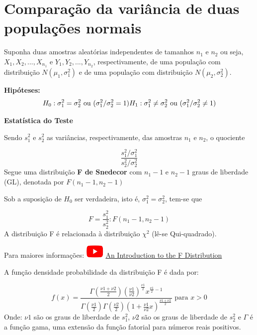 \documentclass[
]{book}
\begin{document}
\hypertarget{comparauxe7uxe3o-da-variuxe2ncia-de-duas-populauxe7uxf5es-normais}{%
\section{Comparação da variância de duas populações normais}\label{comparauxe7uxe3o-da-variuxe2ncia-de-duas-populauxe7uxf5es-normais}}

Suponha duas amostras aleatórias independentes de tamanhos \(n_1\) e \(n_2\) ou seja, \(X_1,X_2,...,X_{n_1}\) e \(Y_1,Y_2,...,Y_{n_2}\), respectivamente, de uma população com distribuição \(N(\mu_1, \sigma_1^2)\) e de uma população com distribuição \(N(\mu_2, \sigma_2^2)\).

\textbf{Hipóteses:}
\[
H_0: \sigma_1^2 = \sigma_2^2 \text{   ou   } (\sigma_1^2 /\sigma_2^2 =1) \\
H_1: \sigma_1^2 \neq \sigma_2^2 \text{   ou   } (\sigma_1^2 /\sigma_2^2 \neq 1)
\]

\textbf{Estatística do Teste}

Sendo \(s_1^2\) e \(s_2^2\) as variâncias, respectivamente, das amostras \(n_1\) e \(n_2\), o quociente

\[
 \frac{s^2_1/\sigma^2_1}{s^2_2/\sigma^2_2}
\]
Segue uma distribuição \textbf{F de Snedecor} com \(n_1-1\) e \(n_2-1\) graus de liberdade (GL), denotada por \(F(n_1-1,n_2-1)\)

Sob a suposição de \(H_0\) ser verdadeira, isto é, \(\sigma_1^2 = \sigma_2^2\), tem-se que

\[
F= \frac{s^2_1}{s^2_2}: F(n_1-1,n_2-1)
\]
A distribuição F é relacionada à distribuição \(\chi^2\) (lê-se Qui-quadrado).

Para maiores informações: \includegraphics{YT.png} \href{https://www.youtube.com/watch?v=G_RDxAZJ-ug}{An Introduction to the F Distribution}

A função densidade probabilidade da distribuição F é dada por:

\[
f(x) = \frac{\Gamma(\frac{\nu1+\nu2}{2})(\frac{\nu1}{\nu2})^{\frac{\nu1}{2}}x^{\frac{\nu1}{2}-1}}{\Gamma(\frac{\nu1}{2}) \Gamma(\frac{\nu2}{2}) (1+\frac{\nu1}{\nu2}x)^{\frac{\nu1+\nu2}{2}}} \text{   para   } x> 0 
\]
Onde: \(\nu1\) são os graus de liberdade de \(s^2_1\), \(\nu2\) são os graus de liberdade de \(s^2_2\) e \(\Gamma\) é a função gama, uma extensão da função fatorial para números reais positivos.
\end{document}
